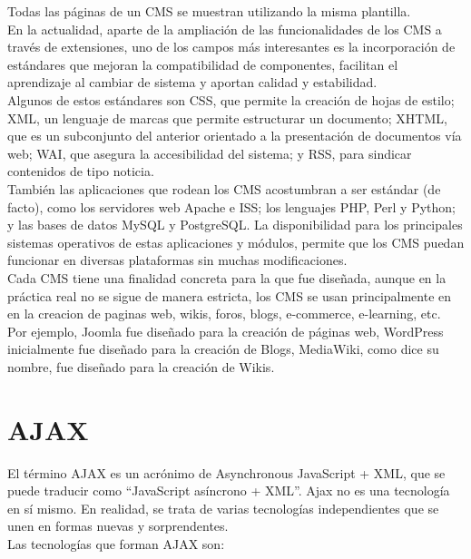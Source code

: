 Todas las p\'aginas de un CMS se muestran utilizando la misma plantilla.\\

En la actualidad, aparte de la ampliaci\'on de las funcionalidades de los CMS a trav\'es de extensiones, uno de los campos m\'as interesantes es la incorporaci\'on de est\'andares que mejoran la compatibilidad de componentes, facilitan el aprendizaje al cambiar de sistema y aportan calidad y estabilidad.\\

Algunos de estos est\'andares son CSS, que permite la creaci\'on de hojas de estilo; XML, un lenguaje de marcas que permite estructurar un documento; XHTML, que es un subconjunto del anterior orientado a la presentaci\'on de documentos v\'ia web; WAI, que asegura la accesibilidad del sistema; y RSS, para sindicar contenidos de tipo noticia.\\

Tambi\'en las aplicaciones que rodean los CMS acostumbran a ser est\'andar (de facto), como los servidores web Apache e ISS; los lenguajes PHP, Perl y Python; y las bases de datos MySQL y PostgreSQL. La disponibilidad para los principales sistemas operativos de estas aplicaciones y m\'odulos, permite que los CMS puedan funcionar en diversas plataformas sin muchas modificaciones.\\

Cada CMS tiene una finalidad concreta para la que fue dise\~nada, aunque en la pr\'actica real no se sigue de manera estricta, los CMS se usan principalmente en en la creacion de paginas web, wikis, foros, blogs, e-commerce, e-learning, etc.\\

Por ejemplo, Joomla fue dise\~nado para la creaci\'on de p\'aginas web, WordPress inicialmente fue dise\~nado para la creaci\'on de Blogs, MediaWiki, como dice su nombre, fue dise\~nado para la creaci\'on de Wikis.

\section{AJAX}
El t\'ermino AJAX es un acr\'onimo de Asynchronous JavaScript + XML, que se puede traducir como ``JavaScript as\'incrono + XML''. Ajax no es una tecnolog\'ia en s\'i mismo. En realidad, se trata de varias tecnolog\'ias independientes que se unen en formas nuevas y sorprendentes. \cite{ajax}\\

Las tecnolog\'ias que forman AJAX son:

